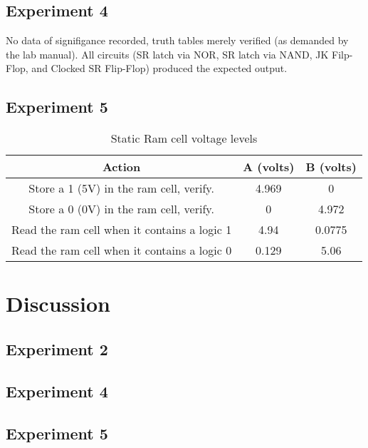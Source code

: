 \documentclass[10pt]{article}
\begin{document}
\subsection{Experiment 4}

No data of signifigance recorded, truth tables merely verified (as
demanded by the lab manual). All circuits (SR latch via NOR, SR latch via
NAND, JK Filp-Flop, and Clocked SR Flip-Flop) produced the expected
output.

\subsection{Experiment 5}

\begin{table}[H]
	\centering
	\begin{tabular}{ c|c|c }
	Action & A (volts) & B (volts) \\ \hline
	Store a 1 (5V) in the ram cell, verify. & 4.969 & 0 \\
	Store a 0 (0V) in the ram cell, verify. & 0     & 4.972 \\
	Read the ram cell when it contains a logic 1 & 4.94 & 0.0775 \\
	Read the ram cell when it contains a logic 0 & 0.129 & 5.06 \\
	\end{tabular}
	\label{tbl:ram}
	\caption{Static Ram cell voltage levels}
\end{table}

\section{Discussion}

\subsection{Experiment 2}

\subsection{Experiment 4}

\subsection{Experiment 5}
\end{document}
